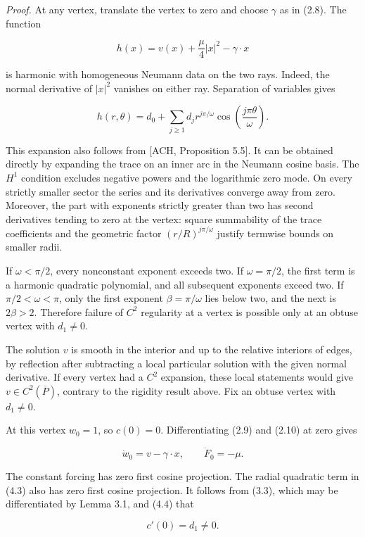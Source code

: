 \documentclass[11pt]{article}
\begin{document}
\emph{Proof.} At any vertex, translate the vertex to zero and choose
\(\gamma\) as in (2.8). The function

\[
h(x)=v(x)+\frac\mu4|x|^2-\gamma\cdot x
\tag{4.3}
\]

is harmonic with homogeneous Neumann data on the two rays. Indeed, the
normal derivative of \(|x|^2\) vanishes on either ray. Separation of
variables gives

\[
h(r,\theta)=d_0+\sum_{j\ge1}d_j r^{j\pi/\omega}
\cos\left(\frac{j\pi\theta}{\omega}\right).
\tag{4.4}
\]

This expansion also follows from {[}ACH, Proposition 5.5{]}. It can be
obtained directly by expanding the trace on an inner arc in the Neumann
cosine basis. The \(H^1\) condition excludes negative powers and the
logarithmic zero mode. On every strictly smaller sector the series and
its derivatives converge away from zero. Moreover, the part with
exponents strictly greater than two has second derivatives tending to
zero at the vertex: square summability of the trace coefficients and the
geometric factor \((r/R)^{j\pi/\omega}\) justify termwise bounds on
smaller radii.

If \(\omega<\pi/2\), every nonconstant exponent exceeds two. If
\(\omega=\pi/2\), the first term is a harmonic quadratic polynomial, and
all subsequent exponents exceed two. If \(\pi/2<\omega<\pi\), only the
first exponent \(\beta=\pi/\omega\) lies below two, and the next is
\(2\beta>2\). Therefore failure of \(C^2\) regularity at a vertex is
possible only at an obtuse vertex with \(d_1\ne0\).

The solution \(v\) is smooth in the interior and up to the relative
interiors of edges, by reflection after subtracting a local particular
solution with the given normal derivative. If every vertex had a \(C^2\)
expansion, these local statements would give \(v\in C^2(\overline P)\),
contrary to the rigidity result above. Fix an obtuse vertex with
\(d_1\ne0\).

At this vertex \(w_0=1\), so \(c(0)=0\). Differentiating (2.9) and
(2.10) at zero gives

\[
\dot w_0=v-\gamma\cdot x,
\qquad \dot F_0=-\mu.
\tag{4.5}
\]

The constant forcing has zero first cosine projection. The radial
quadratic term in (4.3) also has zero first cosine projection. It
follows from (3.3), which may be differentiated by Lemma 3.1, and (4.4)
that

\[
c'(0)=d_1\ne0.
\tag{4.6}
\]
\end{document}
